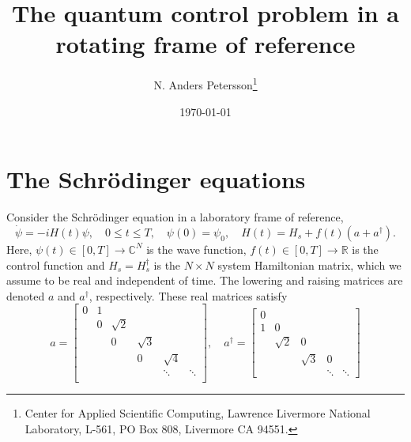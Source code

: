 \documentclass[11pt]{article}
\begin{document}
\title{The quantum control problem in a rotating frame of reference}

\author{N. Anders Petersson\thanks{Center for Applied
    Scientific Computing, Lawrence Livermore National Laboratory, L-561, PO Box 808, Livermore CA
    94551. }}

\date{\today}

\maketitle

\section{The Schr\"odinger equations}
Consider the Schr\"odinger equation in a laboratory frame of reference,
\begin{equation}\label{eq_schrodinger}
\dot{\psi} = -i H(t) \psi,\quad 0\leq t \leq T,\quad \psi(0) = \psi_0,\quad H(t) = H_s + f(t)(a + a^\dag).
\end{equation}
Here, $\psi(t) \in [0,T]\to {\mathbb C}^N$ is the wave function, $f(t)\in [0,T]\to {\mathbb R}$ is
the control function and $H_s = H_s^\dag$ is the $N\times N$ system Hamiltonian matrix, which we
assume to be real and independent of time. The lowering and raising matrices are denoted $a$ and
$a^\dag$, respectively. These real matrices satisfy
\begin{equation}\label{eq_matrices}
%
a = \begin{bmatrix}
0 & 1 & & & &\\
 & 0 & \sqrt{2} & & &\\
&  & 0 & \sqrt{3} & &\\
& &  & 0 & \sqrt{4} & \\
& &  &  & \ddots & \ddots\\
\end{bmatrix},\quad
%
a^\dag = \begin{bmatrix}
0 &  & & &\\
1 & 0 & & &\\
&  \sqrt{2} & 0 &  &\\
& &  \sqrt{3} & 0 & \\
& &  & \ddots & \ddots
\end{bmatrix}
\end{equation}
\end{document}
